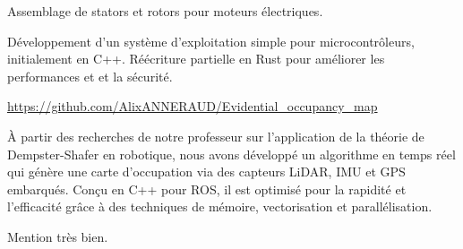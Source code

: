 \documentclass[10pt,a4paper,ragged2e,withhyper]{../AltaCV/altacv}
\begin{document}
\begin{paracol}{2}
  Assemblage de stators et rotors pour moteurs électriques.

  \smallskip


    Développement d'un système d'exploitation simple pour microcontrôleurs, initialement en C++.
    Réécriture partielle en Rust pour améliorer les performances et et la sécurité.

  \divider

  {\url{https://github.com/AlixANNERAUD/Evidential_occupancy_map}}
  {}
  {}

  À partir des recherches de notre professeur sur l’application de la théorie de Dempster-Shafer en robotique, nous avons développé un algorithme en temps réel qui génère une carte d'occupation via des capteurs LiDAR, IMU et GPS embarqués.
  Conçu en C++ pour ROS, il est optimisé pour la rapidité et l’efficacité grâce à des techniques de mémoire, vectorisation et parallélisation.

  \medskip

  \switchcolumn



  \divider

  Mention très bien.

  \divider


  \smallskip



  \divider


  \divider




\end{paracol}
\end{document}
